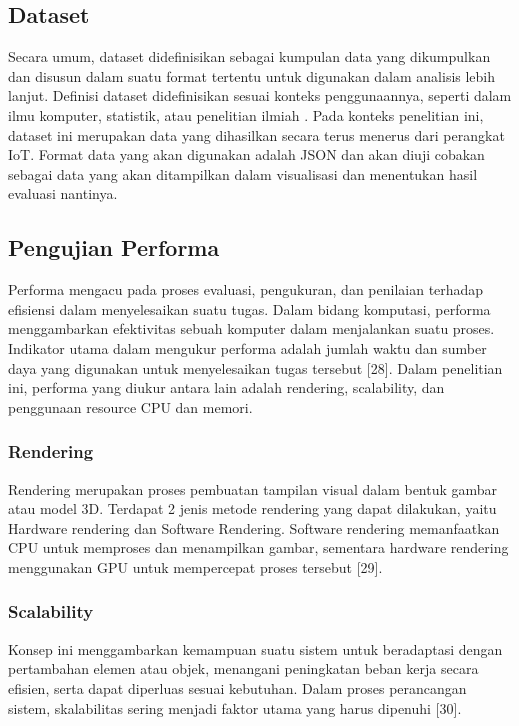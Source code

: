 \subsection{Dataset}
Secara umum, dataset didefinisikan sebagai kumpulan data yang dikumpulkan dan disusun dalam suatu format tertentu untuk digunakan dalam analisis lebih lanjut. Definisi dataset didefinisikan sesuai konteks penggunaannya, seperti dalam ilmu komputer, statistik, atau penelitian ilmiah \cite{Renear2010}. Pada konteks penelitian ini, dataset ini merupakan data yang dihasilkan secara terus menerus dari perangkat IoT. Format data yang akan digunakan adalah JSON dan akan diuji cobakan sebagai data yang akan ditampilkan dalam visualisasi dan menentukan hasil evaluasi nantinya. 

\subsection{Pengujian Performa}
Performa mengacu pada proses evaluasi, pengukuran, dan penilaian terhadap efisiensi dalam menyelesaikan suatu tugas. Dalam bidang komputasi, performa menggambarkan efektivitas sebuah komputer dalam menjalankan suatu proses. Indikator utama dalam mengukur performa adalah jumlah waktu dan sumber daya yang digunakan untuk menyelesaikan tugas tersebut [28]. Dalam penelitian ini, performa yang diukur antara lain adalah rendering, scalability, dan penggunaan resource CPU dan memori. 

\subsubsection{Rendering}
Rendering merupakan proses pembuatan tampilan visual dalam bentuk gambar atau model 3D. Terdapat 2 jenis metode rendering yang dapat dilakukan, yaitu Hardware rendering dan Software Rendering. Software rendering memanfaatkan CPU untuk memproses dan menampilkan gambar, sementara hardware rendering menggunakan GPU untuk mempercepat proses tersebut [29].

\subsubsection{Scalability}
Konsep ini menggambarkan kemampuan suatu sistem untuk beradaptasi dengan pertambahan elemen atau objek, menangani peningkatan beban kerja secara efisien, serta dapat diperluas sesuai kebutuhan. Dalam proses perancangan sistem, skalabilitas sering menjadi faktor utama yang harus dipenuhi [30].

